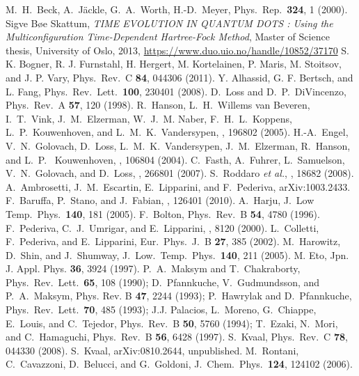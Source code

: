 \documentclass[10pt]{revtex4}
\begin{document}
\begin{thebibliography}{200}
 M.~H.~Beck, A.~J\"ackle, G.~A.~Worth, H.-D.~Meyer, Phys.~Rep.~{\bf 324}, 1 (2000).
 Sigve B\o e Skattum, {\em TIME EVOLUTION IN QUANTUM DOTS : Using the Multiconfiguration Time-Dependent Hartree-Fock Method}, Master of Science thesis, University of Oslo, 2013, \url{https://www.duo.uio.no/handle/10852/37170}
 S. K. Bogner, R. J. Furnstahl, H. Hergert, M. Kortelainen, P. Maris, M. Stoitsov, and J. P. Vary, Phys.~Rev.~C {\bf 84}, 044306 (2011).
 Y. Alhassid, G. F. Bertsch, and L. Fang, Phys.~Rev.~Lett.~{\bf 100}, 230401 (2008).
 D.~Loss and D.~P.~DiVincenzo, Phys.~Rev.~A {\bf 57}, 120 (1998).
 R.~Hanson, L.~H.~Willems van Beveren, I.~T.~Vink, J.~M.~Elzerman, W.~J.~M. Naber, F.~H.~L.~Koppens, L.~P.~Kouwenhoven, and L.~M.~K.~Vandersypen, , 196802 (2005).
 H.-A.~Engel, V.~N.~Golovach, D.~Loss, L.~M.~K.~Vandersypen, J.~M.~Elzerman, R.~Hanson, and L.~P.~ Kouwenhoven, , 106804 (2004). 
 C.~Fasth, A.~Fuhrer, L.~Samuelson, V.~N.~Golovach, and D.~Loss, , 266801 (2007).
 S.~Roddaro {\em et al.}, , 18682 (2008).
A.~Ambrosetti, J.~M.~Escartin, E.~Lipparini, and F.~Pederiva, arXiv:1003.2433.
 F.~Baruffa, P.~Stano, and J.~Fabian, , 126401 (2010).
 A.~Harju, J.~Low Temp.~Phys.~{\bf 140}, 181 (2005).
 F.~Bolton, Phys.~Rev.~B {\bf 54}, 4780 (1996).
F.~Pederiva, C.~J.~Umrigar, and E.~Lipparini, , 8120 (2000).
L.~Colletti, F.~Pederiva, and  E.~Lipparini,  Eur.~Phys.~J.~B {\bf 27}, 
385 (2002).
 M.~Harowitz, D.~Shin, and J.~Shumway, J.~Low.~Temp.~Phys.~{\bf 140}, 211 (2005).
 M. Eto, Jpn. J. Appl. Phys. {\bf 36}, 3924 (1997).
 P.~A.~Maksym and T.~Chakraborty, Phys.~Rev.~Lett.~{\bf 65}, 108 (1990);
D.~Pfannkuche, V.~Gudmundsson, and P.~A.~Maksym, Phys. Rev. B {\bf 47}, 2244 (1993);
P.~Hawrylak and D.~Pfannkuche, Phys.~Rev.~Lett.~{\bf 70}, 485 (1993); J.J. Palacios,
L.~Moreno, G.~Chiappe, E.~Louis, and C.~Tejedor, Phys.~Rev.~B {\bf 50}, 5760 (1994);
T.~Ezaki, N.~Mori, and C.~Hamaguchi, Phys.~Rev.~B {\bf 56}, 6428 (1997).
 S.~Kvaal, Phys.~Rev.~C {\bf 78}, 044330 (2008).
 S.~Kvaal, arXiv:0810.2644, unpublished.
 M.~Rontani, C.~Cavazzoni, 
D.~Belucci, and G.~Goldoni, J.~Chem.~Phys.~{\bf 124}, 124102 (2006).

\end{thebibliography}
\end{document}
